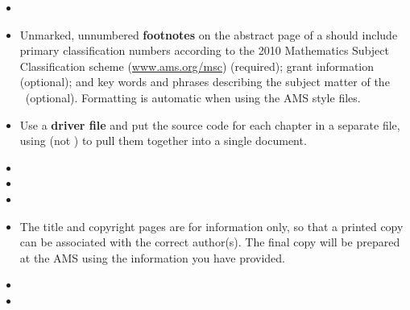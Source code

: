 \begin{itemize}
\item \the\GrantsThanks
 
\item Unmarked, unnumbered \textbf{footnotes} on the abstract page of
 a \Memo{}
 should include primary classification numbers according to the
 2010 Mathematics Subject Classification scheme (\url{www.ams.org/msc})
 (required); grant information (optional); and key words and phrases
 describing the subject matter of the \Memo\ (optional).
 Formatting is automatic when using the AMS style files.

\item Use a \textbf{driver file} and
 put the source code for each chapter in a separate file, using
 \verb++ (not \verb++) to pull them together into a single document.

\item \the\ChapterRight
 
\item \the\ChapterTitleUC

\item \the\RunHeadMM

\item The title and copyright pages are for information only, so that
 a printed copy can be associated with the correct author(s).  The final
 copy will be prepared at the AMS using the information you have provided.

\item \the\BiblioBooks
 
\item \the\ConsentToPublish

\end{itemize}

\endinput

